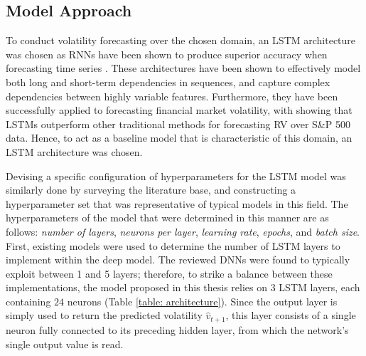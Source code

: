 \documentclass[a4paper, 11pt]{report}
\begin{document}
    \subsection{Model Approach}
    \label{section: model-architecture}

    To conduct volatility forecasting over the chosen domain, an LSTM architecture was chosen as RNNs have been shown to produce superior accuracy when forecasting time series \citep{fjellstrom-2022}. These architectures have been shown to effectively model both long and short-term dependencies in sequences, and capture complex dependencies between highly variable features. Furthermore, they have been successfully applied to forecasting financial market volatility, with \citet{bucci-2020} showing that LSTMs outperform other traditional methods for forecasting RV over S\&P 500 data. Hence, to act as a baseline model that is characteristic of this domain, an LSTM architecture was chosen.

    Devising a specific configuration of hyperparameters for the LSTM model was similarly done by surveying the literature base, and constructing a hyperparameter set that was representative of typical models in this field. The hyperparameters of the model that were determined in this manner are as follows: \emph{number of layers}, \emph{neurons per layer}, \emph{learning rate}, \emph{epochs}, and \emph{batch size}. First, existing models were used to determine the number of LSTM layers to implement within the deep model. The reviewed DNNs were found to typically exploit between 1 \citep{bucci-2020} and 5 \citep{kim-2018} layers; therefore, to strike a balance between these implementations, the model proposed in this thesis relies on $3$ LSTM layers, each containing $24$ neurons (Table \ref{table: architecture}). Since the output layer is simply used to return the predicted volatility $\hat{v}_{t+1}$, this layer consists of a single neuron fully connected to its preceding hidden layer, from which the network's single output value is read.
\end{document}
